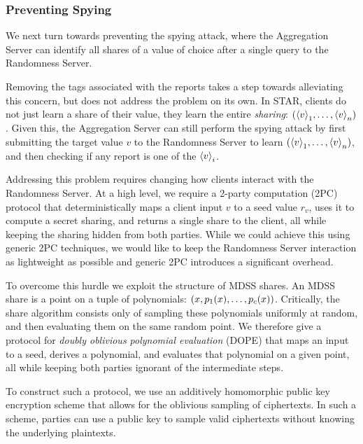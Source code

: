 \subsubsection{Preventing Spying}
We next turn towards preventing the spying attack, where the Aggregation Server can identify all shares of a value of choice after a single query to the Randomness Server.

Removing the tags associated with the reports takes a step towards alleviating this concern, but does not address the problem on its own.
In STAR, clients do not just learn a share of their value, they learn the entire \emph{sharing}: $({\langle v \rangle}_{1}, \dots, {\langle v \rangle}_{n})$.
Given this, the Aggregation Server can still perform the spying attack by first submitting the target value $v$ to the Randomness Server to learn $({\langle v \rangle}_{1}, \dots, {\langle v \rangle}_{n})$, and then checking if any report is one of the ${\langle v \rangle}_{i}$.

Addressing this problem requires changing how clients interact with the Randomness Server. At a high level, we require a 2-party computation (2PC) protocol that deterministically maps a client input $v$ to a seed value $r_v$, uses it to compute a secret sharing, and returns a single share to the client, all while keeping the sharing hidden from both parties. While we could achieve this using generic 2PC techniques, we would like to keep the Randomness Server interaction as lightweight as possible and generic 2PC introduces a significant overhead.

To overcome this hurdle we exploit the structure of MDSS shares.
An MDSS share is a point on a tuple of polynomials: $(x, p_1(x), \dots, p_{c}(x))$.
Critically, the share algorithm consists only of sampling these polynomials uniformly at random, and then evaluating them on the same random point.
We therefore give a protocol for {\em doubly oblivious polynomial evaluation} (DOPE) that maps an input to a seed, derives a polynomial, and evaluates that polynomial on a given point, all while keeping both parties ignorant of the intermediate steps.


To construct such a protocol, we use an additively homomorphic public key encryption scheme that allows for the oblivious sampling of ciphertexts.
In such a scheme, parties can use a public key to sample valid ciphertexts without knowing the underlying plaintexts.


